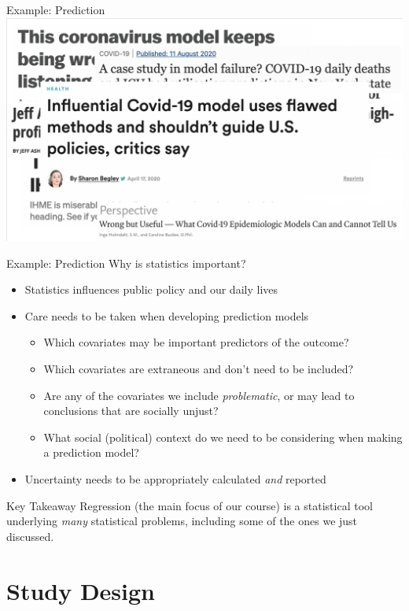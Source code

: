 \documentclass[10pt,t]{beamer}
\begin{document}
\begin{frame}[c]{Example: Prediction}
\centering \includegraphics[scale=0.37]{ihme7.png}
\end{frame}

\begin{frame}{Example: Prediction}
Why is statistics important?
\begin{itemize}
	\item Statistics influences public policy and our daily lives
	\item Care needs to be taken when developing prediction models
	\begin{itemize}
		\item Which covariates may be important predictors of the outcome?
		\item Which covariates are extraneous and don't need to be included?
		\item Are any of the covariates we include \textit{problematic}, or may lead to conclusions that are socially unjust?
		\item What social (political) context do we need to be considering when making a prediction model?
	\end{itemize}
	\item Uncertainty needs to be appropriately calculated \textit{and} reported
\end{itemize}
\end{frame}

\begin{frame}{Key Takeaway}
Regression (the main focus of our course) is a statistical tool underlying \textit{many} statistical problems, including some of the ones we just discussed.
\end{frame}

\section{Study Design}
\end{document}
